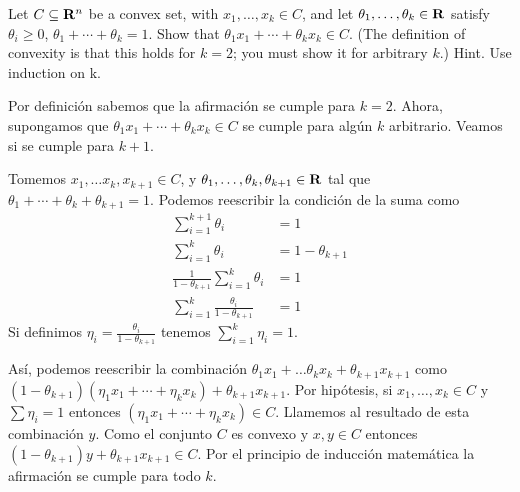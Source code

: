 
\begin{enunciado}{2.1}
Let $C \subseteq \mathbf{R}^n$ be a convex set, with $x_1, \dots, x_k \in C$,
and let $\theta_1, \dots, \theta_k \in \mathbf{R}$ satisfy $\theta_i \geq 0$,
$\theta_1 + \cdots + \theta_k = 1$. Show that $\theta_1x_1 + \cdots + \theta_kx_k \in C$.
(The definition of convexity is that this holds for $k = 2$; you must show it for arbitrary $k$.)
Hint. Use induction on k.
\end{enunciado}


Por definición sabemos que la afirmación se cumple para $k = 2$.
Ahora, supongamos que $\theta_1x_1 + \cdots + \theta_kx_k \in C$ se cumple para algún $k$ arbitrario.
Veamos si se cumple para $k+1$.

Tomemos \(x_1, \dots x_k, x_{k+1} \in C\), y
$\theta_1, \dots, \theta_k, \theta_{k+1} \in \mathbf{R}$ tal que
$\theta_1 + \cdots + \theta_k + \theta_{k+1} = 1$.
Podemos reescribir la condición de la suma como
\begin{align*}
    \sum_{i=1}^{k+1} \theta_i   &= 1 \\
    \sum_{i=1}^{k} \theta_i     &= 1 - \theta_{k+1} \\
    \frac{1}{1-\theta_{k+1}}\sum_{i=1}^{k} \theta_i &= 1 \\
    \sum_{i=1}^{k} \frac{\theta_i}{1-\theta_{k+1}}  &= 1
\end{align*}
Si definimos $\eta_i = \frac{\theta_i}{1-\theta_{k+1}}$ tenemos $\sum_{i=1}^{k} \eta_i  = 1$.


Así, podemos reescribir la combinación $\theta_1x_1 + \dots \theta_kx_k + \theta_{k+1}x_{k+1}$
como $(1-\theta_{k+1})(\eta_1x_1 + \cdots + \eta_kx_k) + \theta_{k+1}x_{k+1}$.
Por hipótesis, si $x_1, \dots, x_k \in C$ y $\sum \eta_i = 1$ entonces $(\eta_1x_1 + \cdots + \eta_kx_k) \in C$.
Llamemos al resultado de esta combinación $y$.
Como el conjunto $C$ es convexo y $x,y\in C$ entonces $(1-\theta_{k+1})y + \theta_{k+1}x_{k+1} \in C$.
Por el principio de inducción matemática la afirmación se cumple para todo $k$. 

